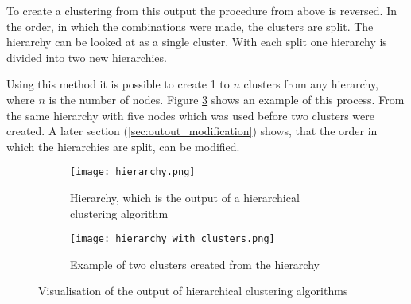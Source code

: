 To create a clustering from this output the procedure from above is reversed. In the order, in which the combinations were made, the clusters are split. The hierarchy can be looked at as a single cluster. With each split one hierarchy is divided into two new hierarchies.

Using this method it is possible to create 1 to $n$ clusters from any hierarchy, where $n$ is the number of nodes. Figure \ref{fig:hierarchy_with_clusters} shows an example of this process. From the same hierarchy with five nodes which was used before two clusters were created. A later section (\ref{sec:outout_modification}) shows, that the order in which the hierarchies are split, can be modified.

\begin{figure}[!hb]
    \centering
    \begin{subfigure}[b]{\textwidth}
        \begin{mdframed}[style=border]
            \texttt{[image: hierarchy.png]}
        \end{mdframed}
        \caption{Hierarchy, which is the output of a hierarchical clustering algorithm}
        \label{fig:hierarchy}
    \end{subfigure}
    \par\medskip
    \begin{subfigure}[b]{\textwidth}
        \begin{mdframed}[style=border]
            \texttt{[image: hierarchy\_with\_clusters.png]}
        \end{mdframed}
        \caption{Example of two clusters created from the hierarchy}
        \label{fig:hierarchy_with_clusters}
    \end{subfigure}
    \caption{Visualisation of the output of hierarchical clustering algorithms}
\end{figure}


